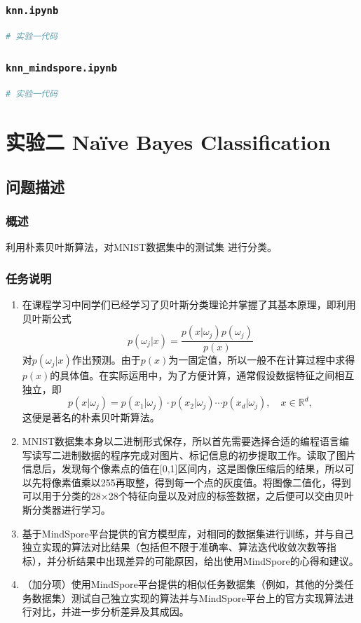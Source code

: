 \documentclass[12pt]{article}
\begin{document}
\subsubsection{\texttt{knn.ipynb}}
\begin{lstlisting}[language=Python]
# 实验一代码
\end{lstlisting}

\subsubsection{\texttt{knn\_mindspore.ipynb}}
\begin{lstlisting}[language=Python]
# 实验一代码
\end{lstlisting}

\newpage
\section{\centering 实验二 Na\"ive Bayes Classification}

\subsection{问题描述}
\subsubsection{概述}
利用朴素贝叶斯算法，对MNIST数据集中的测试集
进行分类。
\subsubsection{任务说明}

\begin{enumerate}
  \item 在课程学习中同学们已经学习了贝叶斯分类理论并掌握了其基本原理，即利用贝叶斯公式
        \[
          p(\omega_j|x) = \frac{p(x|\omega_j)p(\omega_j)}{p(x)}
        \]
        对\(p(\omega_j|x)\)作出预测。由于\(p(x)\)为一固定值，所以一般不在计算过程中求得\(p(x)\)的具体值。在实际运用中，为了方便计算，通常假设数据特征之间相互独立，即
        \[
          p(x|\omega_j) = p(x_1|\omega_j) \cdot p(x_2|\omega_j) \cdots p(x_d|\omega_j), \quad x \in \mathbb{R}^d,
        \]
        这便是著名的朴素贝叶斯算法。

  \item MNIST数据集本身以二进制形式保存，所以首先需要选择合适的编程语言编写读写二进制数据的程序完成对图片、标记信息的初步提取工作。读取了图片信息后，发现每个像素点的值在[0,1]区间内，这是图像压缩后的结果，所以可以先将像素值乘以255再取整，得到每一个点的灰度值。将图像二值化，得到可以用于分类的28×28个特征向量以及对应的标签数据，之后便可以交由贝叶斯分类器进行学习。

  \item 基于MindSpore平台提供的官方模型库，对相同的数据集进行训练，并与自己独立实现的算法对比结果（包括但不限于准确率、算法迭代收敛次数等指标），并分析结果中出现差异的可能原因，给出使用MindSpore的心得和建议。

  \item （加分项）使用MindSpore平台提供的相似任务数据集（例如，其他的分类任务数据集）测试自己独立实现的算法并与MindSpore平台上的官方实现算法进行对比，并进一步分析差异及其成因。
\end{enumerate}
\end{document}

